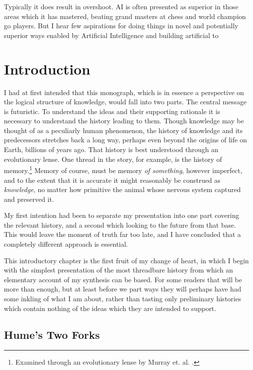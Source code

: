 \documentclass[10pt,titlepage]{book}
\begin{document}
Typically it does result in overshoot.
AI is often presented as superior in those areas which it has mastered, beating grand masters at chess and world champion go players.
But I hear few aspirations for doing things in novel and potentially superior ways enabled by Artificial Intelligence and building artificial to 



\chapter{Introduction}

I had at first intended that this monograph, which is in essence a perspective on the logical structure of knowledge, would fall into two parts.
The central message is futuristic.
To understand the ideas and their supporting rationale it is necessary to understand the history leading to them.
Though knowledge may be thought of as a peculiarly human phenomenon, the history of knowledge and its predecessors stretches back a long way, perhaps even beyond the origins of life on Earth, billions of years ago.
That history is best understood through an evolutionary lense.
One thread in the story, for example, is the history of memory.\footnote{Examined through an evolutionary lense by Murray et. al. \cite{murray2017evolution}.}
Memory of course, must be memory \emph{of something}, however imperfect, and to the extent that it is accurate it might reasonably be construed as \emph{knowledge}, no matter how primitive the animal whose nervous system captured and preserved it.

My first intention had been to separate my presentation into one part covering the relevant history, and a second which looking to the future from that base.
This would leave the moment of truth far too late, and I have concluded that a completely different approach is essential.

This introductory chapter is the first fruit of my change of heart, in which I begin with the simplest presentation of the most threadbare history from which an elementary account of my synthesis can be based.
For some readers that will be more than enough, but at least before we part ways they will perhaps have had some inkling of what I am about, rather than tasting only preliminary histories which contain nothing of the ideas which they are intended to support.

\section{Hume's Two Forks}
\end{document}
